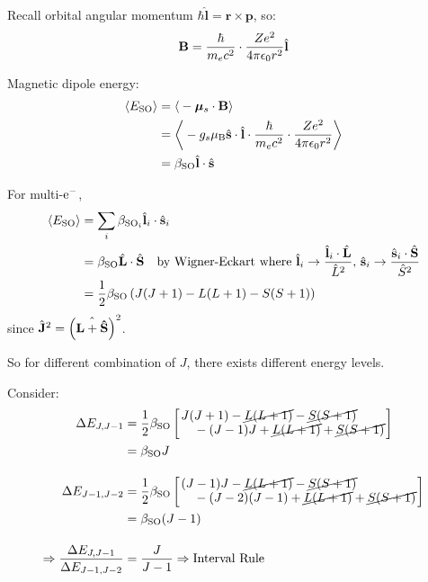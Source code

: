 \begin{parts}
	Recall orbital angular momentum $\hbar\hat{\mathbf{l}} = \mathbf{r}\times\mathbf{p}$, so:
	\begin{equation*}
		\mathbf{B} = \frac{\hbar}{m_e c^2} \cdot \frac{Ze^2}{4\pi\epsilon_{0} r^2} \hat{\mathbf{l}}
	\end{equation*}
	
	Magnetic dipole energy:
	\begin{align*}
		\left\langle{}E_\textnormal{SO}{}\right\rangle &= \left\langle{}-\bm{\mu}_s \cdot \mathbf{B}{}\right\rangle \\
		&= \left\langle{}-g_s \mu_\mathrm{B} \hat{\mathbf{s}}\cdot\hat{\mathbf{l}} \cdot \frac{\hbar}{m_e c^2} \cdot \frac{Ze^2}{4\pi\epsilon_{0} r^2}{}\right\rangle \\
		&= \beta_\textnormal{SO} \hat{\mathbf{l}}\cdot\hat{\mathbf{s}}
	\end{align*}
	
	For multi-$\mathrm{e}^{-}$,
	\begin{align*}
		\left\langle{}E_\textnormal{SO}{}\right\rangle &= \sum_i \beta_{\textnormal{SO}_i} \hat{\mathbf{l}}_i \cdot \hat{\mathbf{s}}_i \\
		&= \beta_\textnormal{SO} \hat{\mathbf{L}}\cdot\hat{\mathbf{S}} \textnormal{\hspace{1em}by Wigner-Eckart where } \hat{\mathbf{l}}_i \to \frac{\hat{\mathbf{l}}_i \cdot \hat{\mathbf{L}}}{\hat{L}^2},\, \hat{\mathbf{s}}_i \to \frac{\hat{\mathbf{s}}_i \cdot \hat{\mathbf{S}}}{\hat{S}^2} \\
		&= \frac{1}{2} \beta_\textnormal{SO} \left(J(J+1)-L(L+1)-S(S+1)\right)
	\end{align*}
	since $\hat{\mathbf{J}}^2 = \left(\hat{\mathbf{L} + \hat{\mathbf{S}}}\right)^2$.
	
	So for different combination of $J$, there exists different energy levels.
	
	Consider:
	\begin{align*}
		\Delta E_{J, J-1} &= \frac{1}{2} \beta_\textnormal{SO} \sbracket{\splitfrac{J(J+1) - \cancel{L(L+1)} - \cancel{S(S+1)}}{- (J-1)J + \cancel{L(L+1)} + \cancel{S(S+1)}}} \\
		&= \beta_\textnormal{SO} J \\[1em]
		\Delta E_{J-1, J-2} &= \frac{1}{2} \beta_\textnormal{SO} \sbracket{\splitfrac{(J-1)J - \cancel{L(L+1)} - \cancel{S(S+1)}}{- (J-2)(J-1) + \cancel{L(L+1)} + \cancel{S(S+1)}}} \\
		&= \beta_\textnormal{SO} (J-1) \\[1em]
		\Rightarrow \frac{\Delta E_{J, J-1}}{\Delta E_{J-1, J-2}} &= \frac{J}{J-1} \Rightarrow \textnormal{Interval Rule}
	\end{align*}
	

\end{parts}
